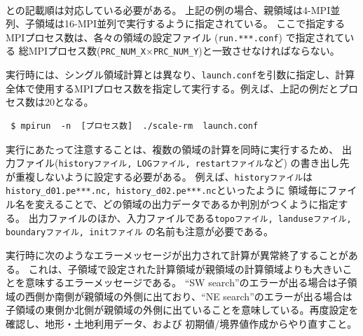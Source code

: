 \\

\noindent
{}との記載順は対応している必要がある。
上記の例の場合、親領域は4-MPI並列、子領域は16-MPI並列で実行するように指定されている。
ここで指定するMPIプロセス数は、各々の領域の設定ファイル (\verb|run.***.conf|) で指定されている
総MPIプロセス数(\verb|PRC_NUM_X|$\times$\verb|PRC_NUM_Y|)と一致させなければならない。

実行時には、シングル領域計算とは異なり、\verb|launch.conf|を引数に指定し、計算全体で使用するMPIプロセス数を指定して実行する。例えば、上記の例だとプロセス数は20となる。
\begin{verbatim}
 $ mpirun  -n  [プロセス数]  ./scale-rm  launch.conf
\end{verbatim}

実行にあたって注意することは、複数の領域の計算を同時に実行するため、
出力ファイル(\verb|historyファイル, LOGファイル, restartファイル|など) の書き出し先が重複しないように設定する必要がある。
例えば、\verb|historyファイル|は\verb|history_d01.pe***.nc, history_d02.pe***.nc|といったように
領域毎にファイル名を変えることで、どの領域の出力データであるか判別がつくように指定する。
出力ファイルのほか、入力ファイルである\verb|topoファイル, landuseファイル, boundaryファイル, initファイル|
の名前も注意が必要である。

実行時に次のようなエラーメッセージが出力されて計算が異常終了することがある。
これは、子領域で設定された計算領域が親領域の計算領域よりも大きいことを意味するエラーメッセージである。
``SW search''のエラーが出る場合は子領域の西側か南側が親領域の外側に出ており、``NE search''のエラーが出る場合は
子領域の東側か北側が親領域の外側に出ていることを意味している。再度設定を確認し、地形・土地利用データ、および
初期値/境界値作成からやり直すこと。\\


\\

